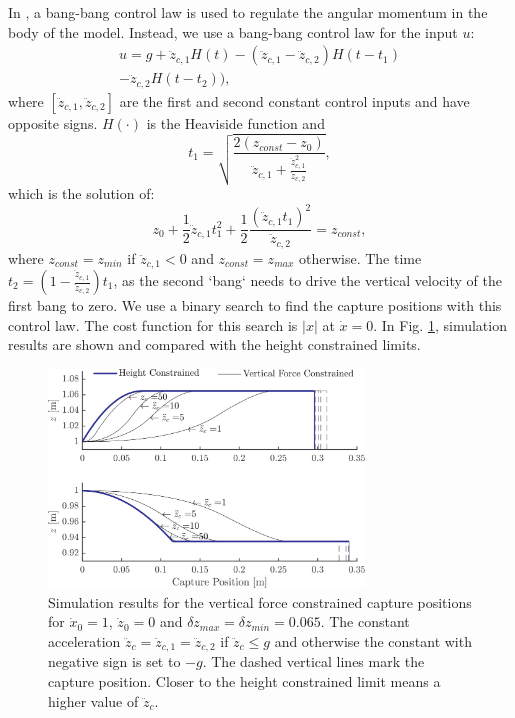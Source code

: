\documentclass[letterpaper, 10 pt, conference]{ieeeconf}  %
\newcommand{\zmin}{z_{min}}
\newcommand{\zmax}{z_{max}}
\newcommand{\ddzcf}{\ddot{z}_{c,1}}
\newcommand{\ddzcs}{\ddot{z}_{c,2}}
\begin{document}
In \cite{pratt2006capture,stephens2007humanoid,koolen2012capturability}, a bang-bang control law is used to regulate the angular momentum in the body of the model. Instead, we use a bang-bang control law for the input $u$:
\begin{multline}
	u = g + \ddot{z}_{c,1}H(t) - (\ddot{z}_{c,1} - \ddot{z}_{c,2})H(t-t_1) \\ - \ddot{z}_{c,2}H(t-t_2)),
\end{multline}
where $[\ddzcf,\ddzcs]$ are the first and second constant control inputs and have opposite signs. $H(\cdot)$ is the Heaviside function and 
\begin{equation}
t_1=\sqrt{\frac{2(z_{const}-z_0)}{\ddzcf + \frac{\ddzcf^2}{\ddzcs}}},
\end{equation}
which is the solution of:
\begin{equation}
	z_0+\frac{1}{2}\ddzcf t_1^2 + \frac{1}{2}\frac{(\ddzcf t_1)^2}{\ddzcs}= z_{const},
\end{equation}
where $z_{const}=\zmin$ if $\ddzcf <0$ and $z_{const}=\zmax$ otherwise. The time $t_2=(1-\frac{\ddzcf}{\ddzcs})t_1$, as the second `bang` needs to drive the vertical velocity of the first bang to zero. We use a binary search to find the capture positions with this control law. The cost function for this search is $|x|$ at $\dot{x}=0$. In Fig. \ref{fig:zvsf}, simulation results are shown and compared with the height constrained limits.
\begin{figure}[h]
      \centering
      \includegraphics[width=3.3in]{heightvsforcelim2.png}
      \caption{Simulation results for the vertical force constrained capture positions for $\dot{x}_0=1$, $\dot{z}_0=0$ and $\delta \zmax=\delta \zmin=0.065$. The constant acceleration $\ddot{z}_c=\ddzcf=\ddzcs$ if $\ddot{z}_c \leq g$ and otherwise the constant with negative sign is set to $-g$. The dashed vertical lines mark the capture position. Closer to the height constrained limit means a higher value of $\ddot{z}_c$.}
      \label{fig:zvsf}
\end{figure}
\end{document}
